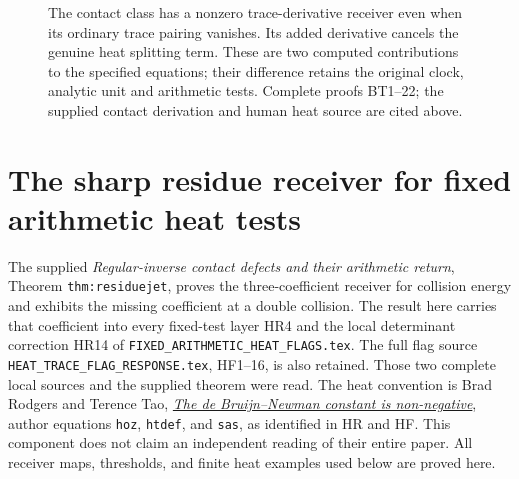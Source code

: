 \begin{figure}[p]
\centering
{}
\caption{The contact class has a nonzero trace-derivative receiver even
when its ordinary trace pairing vanishes. Its added derivative cancels
the genuine heat splitting term. These are two computed contributions
to the specified equations; their difference retains the original clock,
analytic unit and arithmetic tests. Complete proofs BT1--22; the
supplied contact derivation and human heat source are cited above.}
\end{figure}

\clearpage
\section{The sharp residue receiver for fixed arithmetic heat tests}
\label{sec:residue-fixed-receiver}

The supplied \emph{Regular-inverse contact defects and their arithmetic
return}, Theorem \texttt{thm:residuejet}, proves the three-coefficient
receiver for collision energy and exhibits the missing coefficient at a
double collision. The result here carries that coefficient into every
fixed-test layer HR4 and the local determinant correction HR14 of
\texttt{FIXED\_ARITHMETIC\_HEAT\_FLAGS.tex}. The full flag source
\texttt{HEAT\_TRACE\_FLAG\_RESPONSE.tex}, HF1--16, is also retained.
Those two complete local sources and the supplied theorem were read.
The heat convention is Brad Rodgers and Terence Tao,
\href{https://arxiv.org/abs/1801.05914v5}{\emph{The de Bruijn--Newman
constant is non-negative}}, author equations \texttt{hoz},
\texttt{htdef}, and \texttt{sas}, as identified in HR and HF. This
component does not claim an independent reading of their entire paper.
All receiver maps, thresholds, and finite heat examples used below are
proved here.

